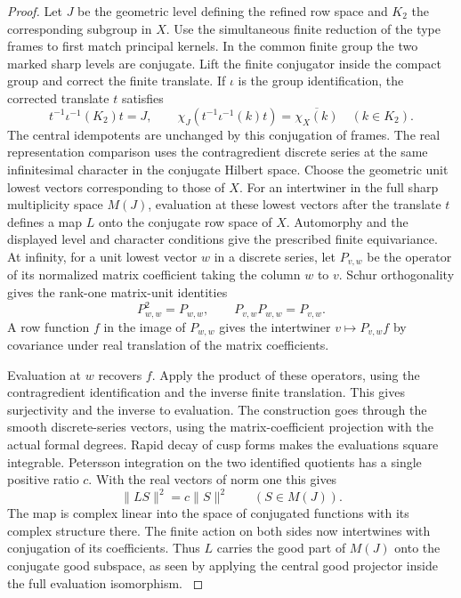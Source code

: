 \begin{proof}
Let \(J\) be the geometric level defining the refined row space and \(K_2\) the
corresponding subgroup in \(X\). Use the simultaneous
finite reduction of the type frames to first match
principal kernels. In the common finite group the two
marked sharp levels are conjugate. Lift the finite
conjugator inside the compact group and correct the
finite translate. If \(\iota\) is the group identification,
the corrected translate \(t\) satisfies
\[
 t^{-1}\iota^{-1}(K_2)t=J,\qquad
 \chi_J(t^{-1}\iota^{-1}(k)t)=\overline{\chi_X(k)}
 \quad(k\in K_2).
\]
The central idempotents are unchanged by this conjugation
of frames. The real representation comparison uses the
contragredient discrete series at the same infinitesimal
character in the conjugate Hilbert space. Choose the
geometric unit lowest vectors corresponding to those
of \(X\). For an intertwiner in the full sharp multiplicity
space \(M(J)\), evaluation at these lowest vectors after
the translate \(t\) defines a map \(L\) onto the conjugate
row space of \(X\). Automorphy and the displayed level
and character conditions give the prescribed finite
equivariance. At infinity, for a unit lowest vector \(w\)
in a discrete series, let \(P_{v,w}\) be the operator
of its normalized matrix coefficient taking the column
\(w\) to \(v\). Schur orthogonality gives the rank-one matrix-unit identities
\[
 P_{w,w}^2=P_{w,w},\qquad P_{v,w}P_{w,w}=P_{v,w}.
\]
A row function \(f\) in the image of \(P_{w,w}\) gives the
intertwiner \(v\mapsto P_{v,w}f\) by covariance under
real translation of the matrix coefficients.

Evaluation
at \(w\) recovers \(f\). Apply the product of these
operators, using the contragredient identification and
the inverse finite translation. This gives surjectivity
and the inverse to evaluation. The construction goes
through the smooth discrete-series vectors, using the
matrix-coefficient projection with the actual formal
degrees. Rapid decay of cusp forms makes the evaluations
square integrable.
Petersson integration on the two identified quotients has
a single positive ratio \(c\). With the real vectors of
norm one this gives
\[
 \|LS\|^2=c\|S\|^2\qquad(S\in M(J)).
\]
The map is complex linear into the space of conjugated
functions with its complex structure there. The
finite action on both sides now intertwines with
conjugation of its coefficients. Thus \(L\) carries the
good part of \(M(J)\) onto the conjugate good subspace,
as seen by applying the central good projector inside
the full evaluation isomorphism.
\label{cor:real-row-realization-5}


\end{proof}
